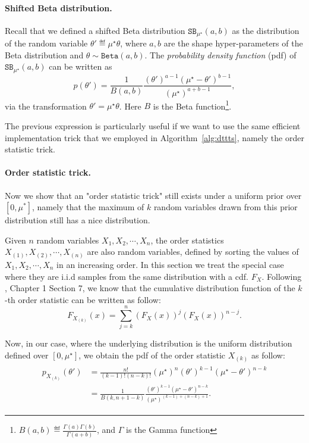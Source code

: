 \paragraph{Shifted Beta distribution.}
Recall that we defined a shifted Beta distribution $\texttt{SB}_{\mu^\star}(a,b)$ as the distribution of the random variable $\theta' \eqdef \mu^\star \theta$, where $a, b$ are the shape hyper-parameters of the Beta distribution and $\theta \sim \texttt{Beta}(a,b)$. The \emph{probability density function} (pdf) of $\texttt{SB}_{\mu^\star}(a,b)$ can be written as
\[
    p(\theta') = \frac{1}{B(a,b)} \frac{(\theta')^{a-1}(\mu^\star-\theta')^{b-1}}{(\mu^\star)^{a+b-1}},
\]
via the transformation $\theta' = \mu^\star\theta$. Here $B$ is the Beta function\footnote{$B(a,b)\eqdef\frac{\Gamma(a)\Gamma(b)}{\Gamma(a+b)}$, and $\Gamma$ is the Gamma function}.

The previous expression is particularly useful if we want to use the same efficient implementation trick that we employed in Algorithm~\ref{alg:dttts}, namely the order statistic trick.

\paragraph{Order statistic trick.}
Now we show that an "order statistic trick" still exists under a uniform prior over $[0,\mu^*]$, namely that the maximum of $k$ random variables drawn from this prior distribution still has a nice distribution.

Given $n$ random variables $X_1, X_2, \cdots, X_n$, the order statistics $X_{(1)}, X_{(2)}, \cdots, X_{(n)}$ are also random variables, defined by sorting the values of $X_1, X_2, \cdots, X_n$ in an increasing order. In this section we treat the special case where they are i.i.d samples from the same distribution with a cdf. $F_X$.
Following \cite{gentle2009}, Chapter 1 Section 7, we know that the cumulative distribution function of the $k$-th order statistic can be written as follow:
\[
    F_{X_{(k)}}(x) = \sum_{j=k}^{n} (F_X(x))^j (F_X(x))^{n-j}.
\]


Now, in our case, where the underlying distribution is the uniform distribution defined over $[0, \mu^\star]$, we obtain the pdf of the order statistic $X_{(k)}$ as follow:
\begin{align*}\label{eq:sb}
\begin{split}
    p_{X_{(k)}}(\theta') &= \frac{n!}{(k-1)!(n-k)!} (\mu^\star)^n (\theta')^{k-1}(\mu^\star-\theta')^{n-k} \\
                        &= \frac{1}{B(k, n+1-k)} \frac{(\theta')^{k-1}(\mu^\star-\theta')^{n-k}}{(\mu^\star)^{(k-1)+(n-k)+1}}.
\end{split}
\end{align*}

